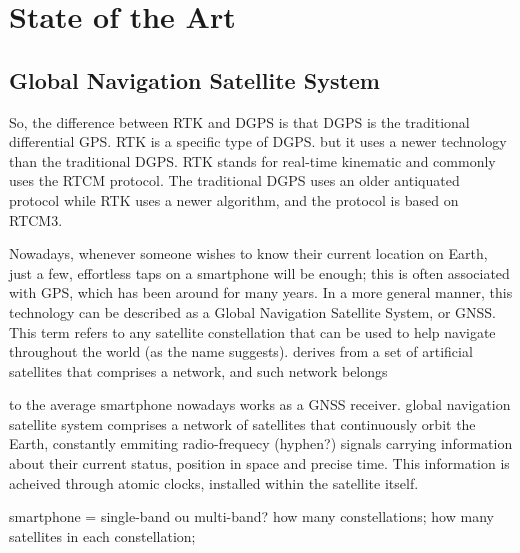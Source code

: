 

\glsresetall
\chapter{State of the Art}\label{cha:II_SotA}

\section{Global Navigation Satellite System}\label{II_gnss}

So, the difference between RTK and DGPS is that DGPS is the traditional differential GPS.
RTK is a specific type of DGPS.
but it uses a newer technology than the traditional DGPS.
RTK stands for real-time kinematic and commonly uses the RTCM protocol.
The traditional DGPS uses an older antiquated protocol while RTK uses a newer algorithm, and the protocol is based on RTCM3. 

Nowadays, whenever someone wishes to know their current location on Earth, just a few, effortless taps on a smartphone will be enough; this is often associated with GPS, which has been around for many years. In a more general manner, this technology can be described as a Global Navigation Satellite System, or GNSS. This term refers to any satellite constellation that can be used to help navigate throughout the world (as the name suggests). derives from a set of artificial satellites that comprises a network, and such network belongs 

to the average smartphone nowadays works as a GNSS receiver.
global navigation satellite system comprises a network of satellites that continuously orbit the Earth, constantly emmiting radio-frequecy (hyphen?) signals carrying information about their current status, position in space and precise time.
This information is acheived through atomic clocks, installed within the satellite itself.

smartphone = single-band ou multi-band?
how many constellations;
how many satellites in each constellation;

